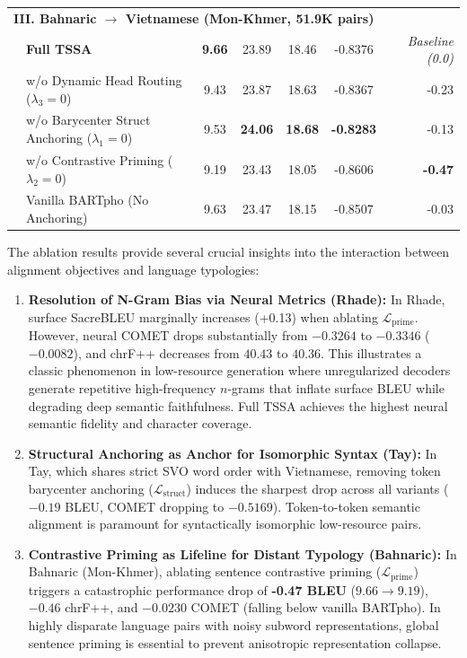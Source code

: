 \documentclass[11pt,a4paper]{article}
\begin{document}
\begin{table}[htbp]
{\begin{tabular}{llccccr}
\midrule
\multicolumn{7}{l}{\textbf{III. Bahnaric $\rightarrow$ Vietnamese (Mon-Khmer, 51.9K pairs)}} \\
\rowcolor{highlightgreen}
 & \textbf{Full TSSA} & \textbf{9.66} & 23.89 & 18.46 & -0.8376 & \textit{Baseline (0.0)} \\
 & w/o Dynamic Head Routing ($\lambda_3 = 0$) & 9.43 & 23.87 & 18.63 & -0.8367 & -0.23 \\
 & w/o Barycenter Struct Anchoring ($\lambda_1 = 0$) & 9.53 & \textbf{24.06} & \textbf{18.68} & \textbf{-0.8283} & -0.13 \\
 & w/o Contrastive Priming ($\lambda_2 = 0$) & 9.19 & 23.43 & 18.05 & -0.8606 & \textbf{-0.47} \\
 & Vanilla BARTpho (No Anchoring) & 9.63 & 23.47 & 18.15 & -0.8507 & -0.03 \\
\bottomrule
\end{tabular}
}
\end{table}

The ablation results provide several crucial insights into the interaction between alignment objectives and language typologies:
\begin{enumerate}[leftmargin=*]
    \item \textbf{Resolution of N-Gram Bias via Neural Metrics (Rhade):} In Rhade, surface SacreBLEU marginally increases (+0.13) when ablating $\mathcal{L}_{\text{prime}}$. However, neural COMET drops substantially from $-0.3264$ to $-0.3346$ ($-0.0082$), and chrF++ decreases from $40.43$ to $40.36$. This illustrates a classic phenomenon in low-resource generation where unregularized decoders generate repetitive high-frequency $n$-grams that inflate surface BLEU while degrading deep semantic faithfulness. Full TSSA achieves the highest neural semantic fidelity and character coverage.
    \item \textbf{Structural Anchoring as Anchor for Isomorphic Syntax (Tay):} In Tay, which shares strict SVO word order with Vietnamese, removing token barycenter anchoring ($\mathcal{L}_{\text{struct}}$) induces the sharpest drop across all variants ($-0.19$ BLEU, COMET dropping to $-0.5169$). Token-to-token semantic alignment is paramount for syntactically isomorphic low-resource pairs.
    \item \textbf{Contrastive Priming as Lifeline for Distant Typology (Bahnaric):} In Bahnaric (Mon-Khmer), ablating sentence contrastive priming ($\mathcal{L}_{\text{prime}}$) triggers a catastrophic performance drop of \textbf{-0.47 BLEU} ($9.66 \rightarrow 9.19$), $-0.46$ chrF++, and $-0.0230$ COMET (falling below vanilla BARTpho). In highly disparate language pairs with noisy subword representations, global sentence priming is essential to prevent anisotropic representation collapse.
\end{enumerate}
\end{document}
